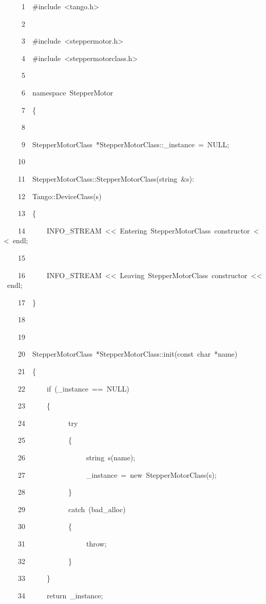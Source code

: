  
\begin{lyxcode}
~~~~~1~~\#include~<tango.h>

~~~~~2~~

~~~~~3~~\#include~<steppermotor.h>

~~~~~4~~\#include~<steppermotorclass.h>

~~~~~5~~

~~~~~6~~namespace~StepperMotor

~~~~~7~~\{

~~~~~8~~

~~~~~9~~StepperMotorClass~{*}StepperMotorClass::\_instance~=~NULL;

~~~~10~~

~~~~11~~StepperMotorClass::StepperMotorClass(string~\&s):

~~~~12~~Tango::DeviceClass(s)

~~~~13~~\{

~~~~14~~~~~~INFO\_STREAM~<\textcompwordmark{}<~\textquotedbl{}Entering~StepperMotorClass~constructor\textquotedbl{}~<\textcompwordmark{}<~endl;

~~~~15~~~~~~~~~~

~~~~16~~~~~~INFO\_STREAM~<\textcompwordmark{}<~\textquotedbl{}Leaving~StepperMotorClass~constructor\textquotedbl{}~<\textcompwordmark{}<~endl;

~~~~17~~\}

~~~~18~~

~~~~19~~

~~~~20~~StepperMotorClass~{*}StepperMotorClass::init(const~char~{*}name)

~~~~21~~\{

~~~~22~~~~~~if~(\_instance~==~NULL)

~~~~23~~~~~~\{

~~~~24~~~~~~~~~~~~try

~~~~25~~~~~~~~~~~~\{

~~~~26~~~~~~~~~~~~~~~~~string~s(name);

~~~~27~~~~~~~~~~~~~~~~~\_instance~=~new~StepperMotorClass(s);

~~~~28~~~~~~~~~~~~\}

~~~~29~~~~~~~~~~~~catch~(bad\_alloc)

~~~~30~~~~~~~~~~~~\{

~~~~31~~~~~~~~~~~~~~~~~throw;

~~~~32~~~~~~~~~~~~\}~~~~~~~~~~~~~~~

~~~~33~~~~~~\}~~~~~~~~~~~~~~~

~~~~34~~~~~~return~\_instance;


\end{lyxcode}
